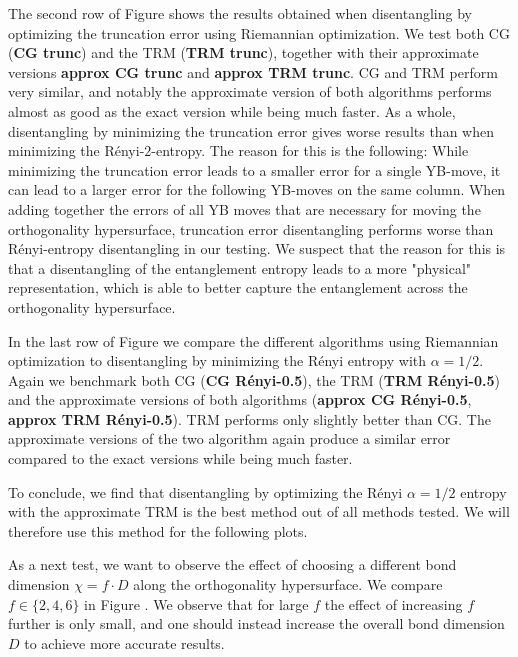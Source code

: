 The second row of Figure  shows the results obtained when disentangling by optimizing the truncation error using Riemannian optimization.  We test both CG (\textbf{CG trunc}) and the TRM (\textbf{TRM trunc}), together with their approximate versions \textbf{approx CG trunc} and \textbf{approx TRM trunc}. CG and TRM perform very similar, and notably the approximate version of both algorithms performs almost as good as the exact version while being much faster. As a whole, disentangling by minimizing the truncation error gives worse results than when minimizing the Rényi-$2$-entropy. The reason for this is the following: While minimizing the truncation error leads to a smaller error for a single YB-move, it can lead to a larger error for the following YB-moves on the same column. When adding together the errors of all YB moves that are necessary for moving the orthogonality hypersurface, truncation error disentangling performs worse than Rényi-entropy disentangling in our testing. We suspect that the reason for this is that a disentangling of the entanglement entropy leads to a more "physical" representation, which is able to better capture the entanglement across the orthogonality hypersurface. \par
In the last row of Figure  we compare the different algorithms using Riemannian optimization to disentangling by minimizing the Rényi entropy with $\alpha = 1/2$. Again we benchmark both CG (\textbf{CG Rényi-0.5}), the TRM (\textbf{TRM Rényi-0.5}) and the approximate versions of both algorithms (\textbf{approx CG Rényi-0.5}, \textbf{approx TRM Rényi-0.5}). TRM performs only slightly better than CG. The approximate versions of the two algorithm again produce a similar error compared to the exact versions while being much faster. \par
To conclude, we find that disentangling by optimizing the Rényi $\alpha=1/2$ entropy with the approximate TRM is the best method out of all methods tested. We will therefore use this method for the following plots. \par
%

%
As a next test, we want to observe the effect of choosing a different bond dimension $\chi = f\cdot D$ along the orthogonality hypersurface. We compare $f \in\{2, 4, 6\}$ in Figure . We observe that for large $f$ the effect of increasing $f$ further is only small, and one should instead increase the overall bond dimension $D$ to achieve more accurate results. \par
